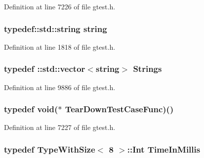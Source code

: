 \-Definition at line 7226 of file gtest.\-h.

\hypertarget{namespacetesting_1_1internal_a9882e571372fc19a02d2b2949e1f1557}{
\subsubsection[{string}]{\setlength{\rightskip}{0pt plus 5cm}typedef\-::std\-::string {\bf string}}}\label{d0/da7/namespacetesting_1_1internal_a9882e571372fc19a02d2b2949e1f1557}


\-Definition at line 1818 of file gtest.\-h.

\hypertarget{namespacetesting_1_1internal_a6d618e88721d4c38cbecabe0d2e8341c}{
\subsubsection[{\-Strings}]{\setlength{\rightskip}{0pt plus 5cm}typedef \-::std\-::vector$<${\bf string}$>$ {\bf \-Strings}}}\label{d0/da7/namespacetesting_1_1internal_a6d618e88721d4c38cbecabe0d2e8341c}


\-Definition at line 9886 of file gtest.\-h.

\hypertarget{namespacetesting_1_1internal_a0d7d11b7ce3a8f9d969e0dfb543dde3d}{
\subsubsection[{\-Tear\-Down\-Test\-Case\-Func}]{\setlength{\rightskip}{0pt plus 5cm}typedef void($\ast$ {\bf \-Tear\-Down\-Test\-Case\-Func})()}}\label{d0/da7/namespacetesting_1_1internal_a0d7d11b7ce3a8f9d969e0dfb543dde3d}


\-Definition at line 7227 of file gtest.\-h.

\hypertarget{namespacetesting_1_1internal_a9e0fb32f592d143f031a3431366adae0}{
\subsubsection[{\-Time\-In\-Millis}]{\setlength{\rightskip}{0pt plus 5cm}typedef {\bf \-Type\-With\-Size}$<$ 8 $>$\-::\-Int {\bf \-Time\-In\-Millis}}}\label{d0/da7/namespacetesting_1_1internal_a9e0fb32f592d143f031a3431366adae0}


